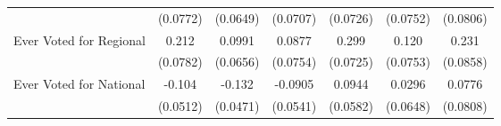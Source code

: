 {\begin{tabular}{l*{6}{c}}
            &    (0.0772)         &    (0.0649)         &    (0.0707)         &    (0.0726)         &    (0.0752)         &    (0.0806)         \\
\addlinespace
Ever Voted for Regional&       0.212\sym{**} &      0.0991         &      0.0877         &       0.299\sym{***}&       0.120         &       0.231\sym{**} \\
            &    (0.0782)         &    (0.0656)         &    (0.0754)         &    (0.0725)         &    (0.0753)         &    (0.0858)         \\
\addlinespace
Ever Voted for National&      -0.104\sym{*}  &      -0.132\sym{**} &     -0.0905         &      0.0944         &      0.0296         &      0.0776         \\
            &    (0.0512)         &    (0.0471)         &    (0.0541)         &    (0.0582)         &    (0.0648)         &    (0.0808)         \\
\bottomrule
\end{tabular}
}
